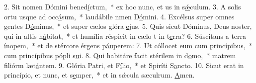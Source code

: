 2. Sit nomen Dómini bened\uline{í}ctum,~* ex hoc nunc, et us in s\uline{ǽ}culum.
3. A solis ortu usque ad occ\uline{á}sum,~* laudábile nmen D\uline{ó}mini.
4. Excélsus super omnes gentes D\uline{ó}minus,~* et super cælos glóra \uline{e}jus.
5. Quis sicut Dóminus, Deus noster, qui in altis h\uline{á}bitat,~* et humília réspicit in cælo t in t\uline{e}rra?
6. Súscitans a terra \uline{í}nopem,~* et de stércore érgens p\uline{áu}perem:
7. Ut cóllocet eum cum princ\uline{í}pibus,~* cum princípibus pópli s\uline{u}i.
8. Qui habitáre facit stérilem in d\uline{o}mo,~* matrem filiórm læt\uline{á}ntem.
9. Glória Patri, et F\uline{í}lio,~* et Spiríti S\uline{a}ncto.
10. Sicut erat in princípio, et nunc, et s\uline{e}mper,~* et in sǽcula sæculrum. \uline{A}men.

